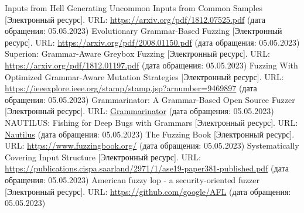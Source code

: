 \documentclass[a4paper]{article}
\begin{document}
\begin{thebibliography}{}
      Inputs from Hell Generating Uncommon Inputs from Common Samples [Электронный ресурс]. URL: \href{https://arxiv.org/pdf/1812.07525.pdf}{https://arxiv.org/pdf/1812.07525.pdf} (дата обращения: 05.05.2023)
      Evolutionary Grammar-Based Fuzzing [Электронный ресурс]. URL: \href{https://arxiv.org/pdf/2008.01150.pdf}{https://arxiv.org/pdf/2008.01150.pdf} (дата обращения: 05.05.2023)
      Superion: Grammar-Aware Greybox Fuzzing [Электронный ресурс]. URL: \href{https://arxiv.org/pdf/1812.01197.pdf}{https://arxiv.org/pdf/1812.01197.pdf} (дата обращения: 05.05.2023)
      Fuzzing With Optimized Grammar-Aware
    Mutation Strategies [Электронный ресурс]. URL: \href{https://ieeexplore.ieee.org/stamp/stamp.jsp?arnumber=9469897}{https://ieeexplore.ieee.org/stamp/stamp.jsp?arnumber=9469897} (дата обращения: 05.05.2023)
      Grammarinator:
    A Grammar-Based Open Source Fuzzer [Электронный ресурс]. 
    URL: \href{https://www.researchgate.net/publication/328510752\_Grammarinator\_a\_grammar-based\_open\_source\_fuzzer}{Grammarinator}
    (дата обращения: 05.05.2023)
      NAUTILUS:
    Fishing for Deep Bugs with Grammars [Электронный ресурс]. URL: \href{https://www.ndss-symposium.org/wp-content/uploads/2019/02/ndss2019\_04A-3\_Aschermann\_paper.pdf}{Nautilus} (дата обращения: 05.05.2023)
      The Fuzzing Book [Электронный ресурс]. URL: \href{https://www.fuzzingbook.org/}{https://www.fuzzingbook.org/} (дата обращения: 05.05.2023)
      Systematically Covering Input Structure [Электронный ресурс]. URL: \href{https://publications.cispa.saarland/2971/1/ase19-paper381-published.pdf}{https://publications.cispa.saarland/2971/1/ase19-paper381-published.pdf} (дата обращения: 05.05.2023)
      American fuzzy lop - a security-oriented fuzzer [Электронный ресурс]. URL: \href{https://github.com/google/AFL}{https://github.com/google/AFL} (дата обращения: 05.05.2023)
\end{thebibliography}
\end{document}
